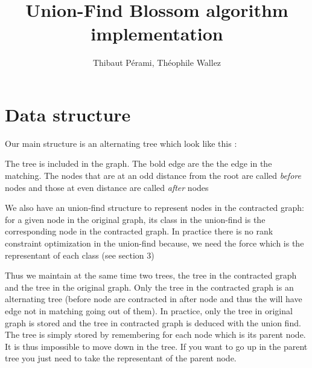 \documentclass[a4paper,12pt]{article}
\title{Union-Find Blossom algorithm implementation}
\author{Thibaut Pérami, Théophile Wallez}
\renewcommand{\(}{\left(}
\renewcommand{\)}{\right)}
\begin{document}
\maketitle

\section{Data structure}

Our main structure is an alternating tree which look like this :

\begin{center}
\end{center}

The tree is included in the graph. The bold edge are the the edge in the
matching. The nodes that are at an odd distance from the root are called
\emph{before} nodes and those at even distance are called \emph{after} nodes

We also have an union-find structure to represent nodes in the contracted graph: for a
given node in the original graph, its class in the union-find is the
corresponding node in the contracted graph. In practice there is no rank
constraint optimization in the union-find because, we need the force which is
the representant of each class (see section 3)

Thus we maintain at the same time two trees, the tree in the contracted graph and the
tree in the original graph. Only the tree in the contracted graph is an
alternating tree (before node are contracted in after node and thus the will
have edge not in matching going out of them).
In practice, only the tree in original graph is
stored and the tree in contracted graph is deduced with the union find. The tree
is simply stored by remembering for each node which is its parent node. It is
thus impossible to move down in the tree. If you want to go up in the parent
tree you just need to take the representant of the parent node.
\end{document}
